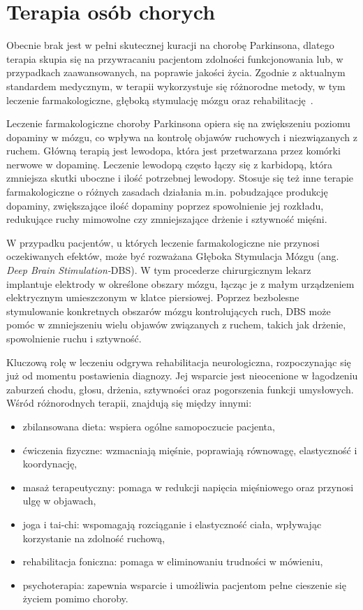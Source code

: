 
\section{Terapia osób chorych}
\label{sec:terapia}
Obecnie brak jest w pełni skutecznej kuracji na chorobę Parkinsona, dlatego terapia skupia się na przywracaniu pacjentom zdolności funkcjonowania
lub, w przypadkach zaawansowanych, na poprawie jakości życia.
Zgodnie z aktualnym standardem medycznym, w terapii wykorzystuje się różnorodne metody, w tym leczenie farmakologiczne, głęboką stymulację mózgu oraz rehabilitację~\cite{National_Institute_on_Aging_2022}.

Leczenie farmakologiczne choroby Parkinsona opiera się na zwiększeniu poziomu dopaminy w mózgu, co wpływa na kontrolę objawów
ruchowych i niezwiązanych z ruchem.
Główną terapią jest lewodopa, która jest przetwarzana przez komórki nerwowe w dopaminę.
Leczenie lewodopą często łączy się z karbidopą, która zmniejsza skutki uboczne i ilość potrzebnej lewodopy.
Stosuje się też inne terapie farmakologiczne o różnych zasadach działania m.in.
pobudzające produkcję dopaminy,
zwiększające ilość dopaminy poprzez spowolnienie jej rozkładu, redukujące ruchy mimowolne czy zmniejszające drżenie i sztywność mięśni.

W przypadku pacjentów, u których leczenie farmakologiczne nie przynosi oczekiwanych efektów, może być rozważana Głęboka Stymulacja Mózgu (ang. \emph{Deep Brain Stimulation-}DBS).
W tym procederze chirurgicznym lekarz implantuje elektrody w określone obszary mózgu, łącząc je z małym urządzeniem elektrycznym umieszczonym w klatce piersiowej.
Poprzez bezbolesne stymulowanie konkretnych obszarów mózgu kontrolujących ruch, DBS może pomóc w zmniejszeniu wielu objawów związanych z ruchem,
takich jak drżenie, spowolnienie ruchu i sztywność.

Kluczową rolę w leczeniu odgrywa rehabilitacja neurologiczna, rozpoczynając się już od momentu postawienia diagnozy.
Jej wsparcie jest nieocenione w łagodzeniu zaburzeń chodu, głosu, drżenia, sztywności oraz pogorszenia funkcji umysłowych.
Wśród różnorodnych terapii, znajdują się między innymi:
\begin{itemize}[itemsep=0.1pt]
	\item zbilansowana dieta: wspiera ogólne samopoczucie pacjenta,
	\item ćwiczenia fizyczne: wzmacniają mięśnie, poprawiają równowagę, elastyczność i koordynację,
	\item masaż terapeutyczny: pomaga w redukcji napięcia mięśniowego oraz przynosi ulgę w objawach,
	\item joga i tai-chi: wspomagają rozciąganie i elastyczność ciała, wpływając korzystanie na zdolność ruchową,
	\item rehabilitacja foniczna: pomaga w eliminowaniu trudności w mówieniu,
	\item psychoterapia: zapewnia wsparcie i umożliwia pacjentom pełne cieszenie się życiem pomimo choroby.
\end{itemize}


